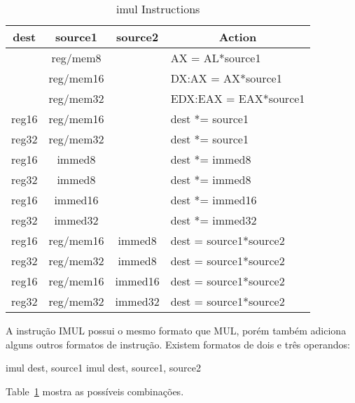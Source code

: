 \begin{table}[t]
\centering
\begin{tabular}{|c|c|c|l|}
\hline
{ \bf dest} & { \bf source1 } & {\bf source2} & \multicolumn{1}{c|}{\bf Action} \\ \hline
            & reg/mem8        &               & AX = AL*source1 \\
            & reg/mem16       &               & DX:AX = AX*source1 \\
            & reg/mem32       &               & EDX:EAX = EAX*source1 \\
reg16       & reg/mem16       &               & dest *= source1 \\
reg32       & reg/mem32       &               & dest *= source1 \\
reg16       & immed8          &               & dest *= immed8 \\
reg32       & immed8          &               & dest *= immed8 \\
reg16       & immed16         &               & dest *= immed16 \\
reg32       & immed32         &               & dest *= immed32 \\
reg16       & reg/mem16       & immed8        & dest = source1*source2 \\
reg32       & reg/mem32       & immed8        & dest = source1*source2 \\
reg16       & reg/mem16       & immed16       & dest = source1*source2 \\
reg32       & reg/mem32       & immed32       & dest = source1*source2 \\
\hline
\end{tabular}
\caption{{\code imul} Instructions \label{tab:imul}}
\end{table}

A instrução {\code IMUL} possui o mesmo formato que {\code MUL}, porém também 
adiciona alguns outros formatos de instrução. Existem formatos de dois e três operandos:
\begin{AsmCodeListing}[numbers=none,frame=none]
      imul   dest, source1
      imul   dest, source1, source2
\end{AsmCodeListing}
Table~\ref{tab:imul} mostra as possíveis combinações.

